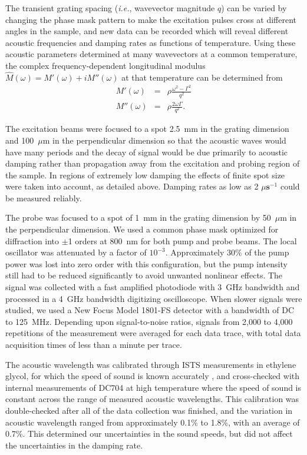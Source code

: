 \documentclass[reprint,showpacs,amsmath,amssymb,aip,jcp]{revtex4-1}
\begin{document}
The transient grating spacing (\emph{i.e.}, wavevector magnitude $q$)
can be varied by changing the phase mask pattern to make the
excitation pulses cross at different angles in the sample, and new
data can be recorded which will reveal different acoustic frequencies
and damping rates as functions of temperature. Using these acoustic
parameters determined at many wavevectors at a common temperature, the
complex frequency-dependent longitudinal modulus
$\hat{M}(\omega)=M'(\omega)+iM''(\omega)$ at that temperature can be
determined from
\begin{eqnarray}
  M'(\omega)&=&\rho\frac{\omega^2-\Gamma^2}{q^2}\\
  M''(\omega)&=&\rho\frac{2\omega\Gamma}{q^2}.
\end{eqnarray}

The excitation beams were focused to a spot 2.5~mm in the grating
dimension and 100~$\mu$m in the perpendicular dimension so that the
acoustic waves would have many periods and the decay of signal would
be due primarily to acoustic damping rather than propagation away from
the excitation and probing region of the sample. In regions of
extremely low damping the effects of finite spot size were taken into
account, as detailed above. Damping rates as low as 2 $\mu
\textbf{s}^{-1}$ could be measured reliably.

The probe was focused to a spot of 1~mm in the grating dimension by
50~$\mu$m in the perpendicular dimension. We used a common phase mask
optimized for diffraction into $\pm$1 orders at 800~nm for both pump
and probe beams. The local oscillator was attenuated by a factor of
$10^{-3}$. Approximately $30\%$ of the pump power was lost into zero
order with this configuration, but the pump intensity still had to be
reduced significantly to avoid unwanted nonlinear effects. The signal
was collected with a fast amplified photodiode with 3~GHz bandwidth
and processed in a 4~GHz bandwidth digitizing oscilloscope. When
slower signals were studied, we used a New Focus Model 1801-FS
detector with a bandwidth of DC to 125~MHz. Depending upon
signal-to-noise ratios, signals from 2,000 to 4,000 repetitions of the
measurement were averaged for each data trace, with total data
acquisition times of less than a minute per trace.

The acoustic wavelength was calibrated through ISTS measurements in
ethylene glycol, for which the speed of sound is known accurately
\cite{ssilence_thesis}, and cross-checked with internal measurements of
DC704 at high temperature where the speed of sound is constant across
the range of measured acoustic wavelengths. This calibration was
double-checked after all of the data collection was finished, and the
variation in acoustic wavelength ranged from approximately 0.1\% to
1.8\%, with an average of 0.7\%. This determined our uncertainties in
the sound speeds, but did not affect the uncertainties in the damping
rate.
\end{document}
